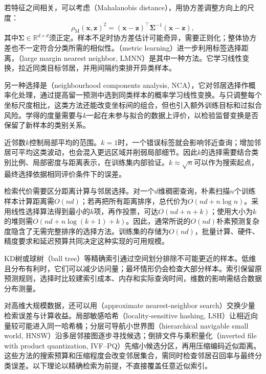 若特征之间相关，可以考虑（Mahalanobis distance），用协方差调整方向上的尺度：
\begin{equation}
  \rho_{\mathrm{M}}(\bm{x},\bm{z})^2
  =(\bm{x}-\bm{z})^\top
   \bm{\Sigma}^{-1}(\bm{x}-\bm{z}),
  \label{eq:classification-mahalanobis}
\end{equation}
其中$\bm{\Sigma}\in\mathbb{R}^{d\times d}$须正定。样本不足时协方差估计可能奇异，需要正则化；整体协方差也不一定符合分类所需的相似性。（metric learning）进一步利用标签选择距离，（large margin nearest neighbor, LMNN）是其中一种方法。它学习线性变换，拉近同类目标邻居，并用间隔约束排开异类样本。

另一种选择是（neighbourhood components analysis, NCA），它对邻居选择作概率化处理，通过提高留一预测中选到同类样本的概率学习线性变换。与只调整每个坐标尺度相比，这类方法还能改变坐标间的组合，但也引入额外训练目标和过拟合风险。学得的度量需要与$k$一起在未参与拟合的数据上评价，以检验监督变换是否保留了新样本的类别关系。

近邻数$k$控制局部平均的范围。$k=1$时，一个错误标签就会影响邻近查询；增加邻居可平均这类波动，也会混入更远区域并削弱局部细节。因此$k$的选择需要结合类别比例、局部密度与距离表示，在训练集内部验证。$k\approx\sqrt n$可以作为搜索起点，最终选择依据相同评价条件下的误差。

检索代价需要区分距离计算与邻居选择。对一个$d$维稠密查询，朴素扫描$n$个训练样本计算距离需$O(nd)$；若再把所有距离排序，总代价为$O(nd+n\log n)$。采用线性选择算法得到最小的$k$项，再作投票，可达$O(nd+n+k)$；使用大小为$k$的堆则需$O(nd+n\log(k+1)+k)$。因此，通常所说的$O(nd)$朴素预测复杂度隐含了无需完整排序的选择方法。训练集的存储为$O(nd)$，批量计算、硬件、精度要求和延迟预算共同决定这种实现的可用规模。

KD树或球树（ball tree）等精确索引通过空间划分排除不可能更近的样本。低维且分布有利时，它们可以减少访问量；最坏情形仍会检查大部分样本。索引保留原预测规则，选择时比较建索引成本、内存和实际查询时间，维数的影响需结合数据分布测量。

对高维大规模数据，还可以用（approximate nearest-neighbor search）交换少量检索误差与计算收益。局部敏感哈希（locality-sensitive hashing, LSH）让相近向量较可能进入同一哈希桶；分层可导航小世界图（hierarchical navigable small world, HNSW）沿多层邻接图逐步寻找候选；倒排文件与乘积量化（inverted file with product quantization, IVF--PQ）先缩小候选分区，再用压缩编码近似距离。这些方法的搜索预算和压缩程度会改变邻居集合，需同时检查邻居召回率与最终分类误差。以下理论以精确检索为前提，不直接覆盖任意近似索引。

